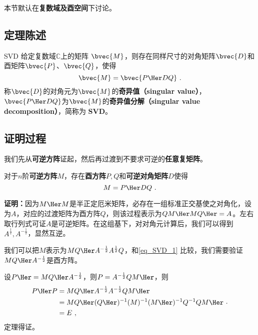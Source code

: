 


本节默认在\textbf{复数域及酉空间}下讨论。
\subsection{定理陈述} 
\begin{theorem}{SVD}
给定复数域$\mathbb{C}$上的矩阵 $\bvec{M}$，则存在同样尺寸的对角矩阵$\bvec{D}$和酉矩阵$\bvec{P}$、$\bvec{Q}$，使得
\begin{equation}
\bvec{M} = \bvec{P\Her DQ}~. 
\end{equation}
称$\bvec{D}$的对角元为$\bvec{M}$的\textbf{奇异值（singular value）}，$\bvec{P\Her DQ}$为$\bvec{M}$的\textbf{奇异值分解（singular value decomposition）}，简称为 \textbf{SVD}。
\end{theorem}


\subsection{证明过程}

我们先从\textbf{可逆方阵}证起，然后再过渡到不要求可逆的\textbf{任意复矩阵}。
\begin{theorem}{}\label{the_SVD_1}
对于$n$阶\textbf{可逆方阵}$M$，存在\textbf{酉方阵}$P,Q$和\textbf{可逆对角矩阵}$D$使得
\begin{equation}\label{eq_SVD_1}
M=P\Her DQ~.
\end{equation}

\end{theorem}
\textbf{证明：}因为$M\Her M$是半正定厄米矩阵，必存在一组标准正交基使之对角化，设为$A$，对应的过渡矩阵为酉方阵$Q$，则该过程表示为$QM\Her MQ\Her =A$。左右取行列式可证$A$是可逆矩阵。在这组基下，对对角元计算后，我们可以得到$A^{\frac{1}{2}},A^{-\frac{1}{2}}$，显然互逆。

我们可以把$M$表示为$MQ\Her A^{-\frac{1}{2}}A^{\frac{1}{2}}Q$，和\autoref{eq_SVD_1} 比较，我们需要验证$MQ\Her A^{-\frac{1}{2}}$是酉方阵。

设$P\Her =MQ\Her A^{-\frac{1}{2}}$，则$P=A^{-\frac{1}{2}}QM\Her $，则
\begin{equation}
\begin{aligned}
P\Her P&=MQ\Her A^{-\frac{1}{2}}A^{-\frac{1}{2}}QM\Her \\
&=MQ\Her (Q\Her )^{-1}(M)^{-1}(M\Her )^{-1}Q^{-1}QM\Her \\
&=E~,
\end{aligned}
~.
\end{equation}
定理得证。

